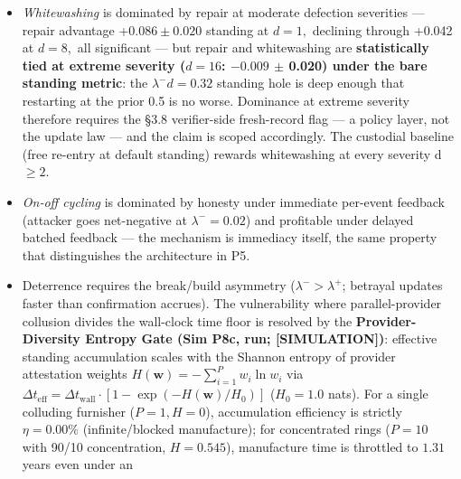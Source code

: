 \documentclass[
]{article}
\begin{document}
\begin{itemize}
\begin{itemize}
    cost falls from \$1.005 to \$0.0001) --- \textbf{without touching
    the Sybil time floor}. Rollups are unambiguously good for this
    reason. \textbf{Caveat (disclosed):} the time floor assumes
    providers refuse to backdate signatures and that one Sybil cannot
    contract many providers in parallel; parallel-provider collusion
    divides the time floor by the number of colluding providers, so m
    and the time floor must be paired with a provider-diversity
    requirement (not modeled here).
  \item
    \emph{Whitewashing} is dominated by repair at moderate defection
    severities --- repair advantage +\(0.086 \pm 0.020\) standing at
    \(d = 1,\) declining through +0.042 at \(d = 8,\) all significant
    --- but repair and whitewashing are \textbf{statistically tied at
    extreme severity (\(d = 16\): \(-0.009\) \(\pm\) 0.020) under the
    bare standing metric}: the \(\lambda^{-}d = 0.32\) standing hole is
    deep enough that restarting at the prior 0.5 is no worse. Dominance
    at extreme severity therefore requires the §3.8 verifier-side
    fresh-record flag --- a policy layer, not the update law --- and the
    claim is scoped accordingly. The custodial baseline (free re-entry
    at default standing) rewards whitewashing at every severity d
    \(\geq 2.\)
  \item
    \emph{On-off cycling} is dominated by honesty under immediate
    per-event feedback (attacker goes net-negative at
    \(\lambda^{-} = 0.02\)) and profitable under delayed batched
    feedback --- the mechanism is immediacy itself, the same property
    that distinguishes the architecture in P5.
  \item
    Deterrence requires the break/build asymmetry
    (\(\lambda^{-} > \lambda^{+}\); betrayal updates faster than
    confirmation accrues). The vulnerability where parallel-provider
    collusion divides the wall-clock time floor is resolved by the
    \textbf{Provider-Diversity Entropy Gate (Sim P8c, run;
    {[}SIMULATION{]})}: effective standing accumulation scales with the
    Shannon entropy of provider attestation weights
    \(H(\mathbf{w}) = -\sum_{i=1}^P w_i \ln w_i\) via
    \(\Delta t_{\mathrm{eff}} = \Delta t_{\mathrm{wall}} \cdot [1 - \exp(-H(\mathbf{w})/H_0)]\)
    (\(H_0 = 1.0\) nats). For a single colluding furnisher
    (\(P=1, H=0\)), accumulation efficiency is strictly
    \(\eta = 0.00\%\) (infinite/blocked manufacture); for concentrated
    rings (\(P=10\) with 90/10 concentration, \(H = 0.545\)),
    manufacture time is throttled to \(1.31\) years even under an

\end{itemize}
\end{itemize}
\end{document}
